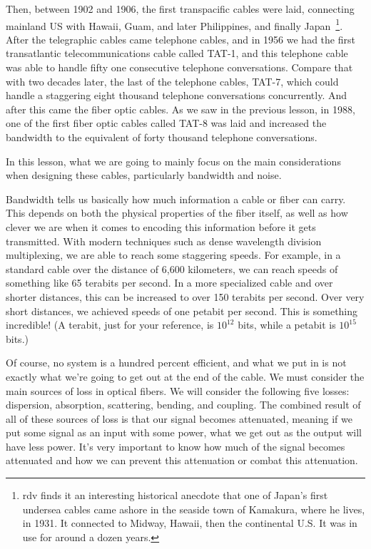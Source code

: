 Then, between 1902 and 1906, the first transpacific cables were laid, connecting mainland US with Hawaii, Guam, and later Philippines, and finally Japan~\footnote{rdv finds it an interesting historical anecdote that one of Japan's first undersea cables came ashore in the seaside town of Kamakura, where he lives, in 1931.  It connected to Midway, Hawaii, then the continental U.S.  It was in use for around a dozen years.}. After the telegraphic cables came telephone cables, and in 1956 we had the first transatlantic telecommunications cable called TAT-1, and this telephone cable was able to handle fifty one consecutive telephone conversations. Compare that with two decades later, the last of the telephone cables, TAT-7, which could handle a staggering eight thousand telephone conversations concurrently. And after this came the fiber optic cables. As we saw in the previous lesson, in 1988, one of the first fiber optic cables called TAT-8 was laid and increased the bandwidth to the equivalent of forty thousand telephone conversations.


In this lesson, what we are going to mainly focus on the main considerations when designing these cables, particularly bandwidth and noise.

Bandwidth tells us basically how much information a cable or fiber can carry.
This depends on both the physical properties of the fiber itself, as well as how clever we are when it comes to encoding this information before it gets transmitted. With modern techniques such as dense wavelength division multiplexing, we are able to reach some staggering speeds. For example, in a standard cable over the distance of 6,600 kilometers, we can reach speeds of something like 65 terabits per second. In a more specialized cable and over shorter distances, this can be increased to over 150 terabits per second. Over very short distances, we achieved speeds of one petabit per second. This is something incredible! (A terabit, just for your reference, is $10^{12}$ bits, while a petabit is $10^{15}$ bits.)

Of course, no system is a hundred percent efficient, and what we put in is not exactly what we're going to get out at the end of the cable. We must consider the main sources of loss in optical fibers. We will consider the following five losses: dispersion, absorption, scattering, bending, and coupling. The combined result of all of these sources of loss is that our signal becomes attenuated, meaning if we put some signal as an input with some power, what we get out as the output will have less power. It's very important to know how much of the signal becomes attenuated and how we can prevent this attenuation or combat this attenuation.

